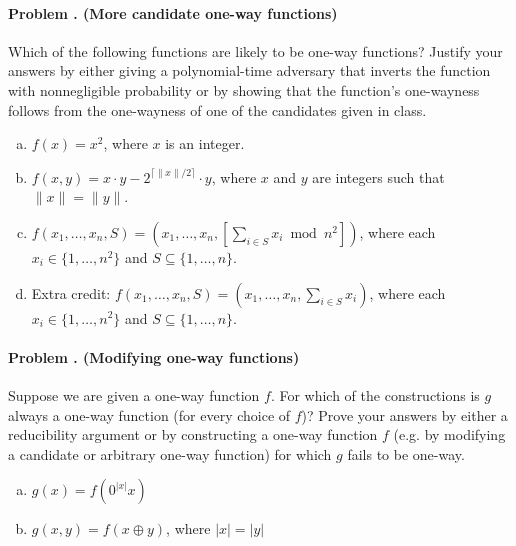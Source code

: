 \documentclass[11pt]{article}
\newcounter{problem}
\newenvironment{problem}[1]{\stepcounter{problem}
\paragraph{Problem \theproblem. #1}}{}
\begin{document}
\begin{problem}{(More candidate one-way functions)}
Which of the following functions are likely to be one-way functions?
Justify your
answers by either giving a polynomial-time adversary that inverts
the function with nonnegligible probability or by showing that the
function's one-wayness follows from the one-wayness of one of the
candidates given in class.

\begin{enumerate}[a)]
\item $f(x)=x^2$, where $x$ is an integer.

\item $f(x,y)=x\cdot y-2^{\lceil \|x\|/2\rceil}\cdot y$, where $x$ and $y$ are integers such that
$\|x\|=\|y\|$.




\item $f(x_1,\ldots,x_n,S) = \left(x_1,\ldots,x_n, \left[\sum_{i\in S} x_i \bmod n^2\right]\right)$, where
each $x_i\in \{1,\ldots,n^2\}$ and $S\subseteq \{1,\ldots,n\}$.

\item Extra credit: $f(x_1,\ldots,x_n,S) = \left(x_1,\ldots,x_n, \sum_{i\in S} x_i\right)$, where
each $x_i\in \{1,\ldots,n^2\}$ and $S\subseteq \{1,\ldots,n\}$.
\end{enumerate}

\end{problem}

\begin{problem}{(Modifying one-way functions)}
Suppose we are given a one-way function $f$. For which of the constructions is $g$ always a one-way function (for every choice of $f$)?  Prove your answers by either a reducibility argument
or by constructing a one-way function $f$ (e.g. by modifying a candidate or arbitrary one-way function) for which $g$ fails to be one-way.

\begin{enumerate}[a)]
\item $g(x) = f(0^{|x|}x)$
\item $g(x, y) = f(x \oplus y)$, where $|x|=|y|$
\end{enumerate}
\end{problem}
\end{document}
